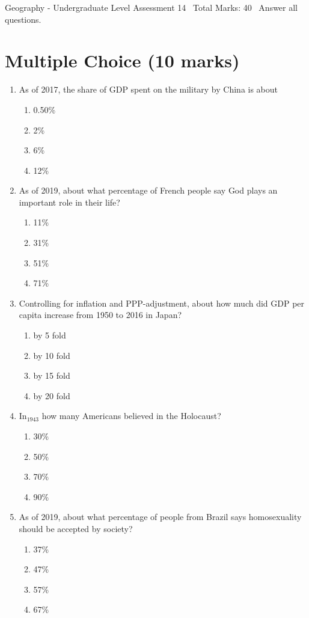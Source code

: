 \documentclass[12pt]{article}
\begin{document}
\begin{center}
Geography - Undergraduate Level Assessment 14 \
Total Marks: 40 \
Answer all questions.
\end{center}

\section*{Multiple Choice (10 marks)}
\begin{enumerate}[label=\arabic*.]
\item As of 2017, the share of GDP spent on the military by China is about
\begin{enumerate}[label=(\alph*)]
    \item 0.50\%
    \item 2\%
    \item 6\%
    \item 12\%
\end{enumerate}
\item As of 2019, about what percentage of French people say God plays an important role in their life?
\begin{enumerate}[label=(\alph*)]
    \item 11\%
    \item 31\%
    \item 51\%
    \item 71\%
\end{enumerate}
\item Controlling for inflation and PPP-adjustment, about how much did GDP per capita increase from 1950 to 2016 in Japan?
\begin{enumerate}[label=(\alph*)]
    \item by 5 fold
    \item by 10 fold
    \item by 15 fold
    \item by 20 fold
\end{enumerate}
\item In$_{1943}$ how many Americans believed in the Holocaust?
\begin{enumerate}[label=(\alph*)]
    \item 30\%
    \item 50\%
    \item 70\%
    \item 90\%
\end{enumerate}
\item As of 2019, about what percentage of people from Brazil says homosexuality should be accepted by society?
\begin{enumerate}[label=(\alph*)]
    \item 37\%
    \item 47\%
    \item 57\%
    \item 67\%
\end{enumerate}
\end{enumerate}
\end{document}
